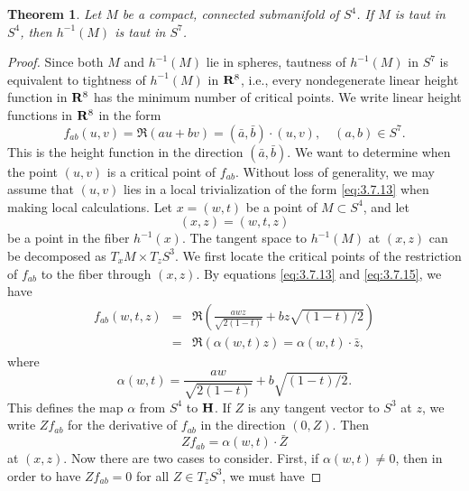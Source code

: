 \documentclass[12pt]{article}
\newtheorem{theorem}{Theorem}[section]
\begin{document}
\begin{theorem}
\label{thm:3.7.1} 
Let $M$ be a compact, connected submanifold of $S^4$.  If $M$ is taut in $S^4$, then $h^{-1}(M)$ is taut in $S^7$.
\end{theorem}
\begin{proof}
Since both $M$ and $h^{-1}(M)$ lie in spheres, tautness of $h^{-1}(M)$ in $S^7$ is equivalent to tightness of
$h^{-1}(M)$ in ${\bf R}^8$, i.e., every nondegenerate linear 
height function in ${\bf R}^8$ has the minimum number
of critical points.  We write linear height functions in ${\bf R}^8$ in the form
\begin{equation} 
\label{eq:3.7.15}
f_{ab} (u,v) = \Re (au + bv) = (\bar{a}, \bar{b}) \cdot (u,v), \quad (a,b) \in S^7.
\end{equation}
This is the height function in the direction $(\bar{a}, \bar{b})$.  We want to determine when the point $(u,v)$
is a critical point of $f_{ab}$.  Without loss of generality, we may assume that $(u,v)$ lies in a local
trivialization of the form \eqref{eq:3.7.13} when making local calculations.  Let $x = (w,t)$ be a point of
$M \subset S^4$, and let 
\begin{displaymath}
(x,z) = (w,t,z)
\end{displaymath}
be a point in the fiber $h^{-1}(x)$.  The tangent space to $h^{-1}(M)$
at $(x,z)$ can be decomposed as $T_x M \times T_z S^3$.  We first locate the critical points of the restriction of 
$f_{ab}$ to the fiber through $(x,z)$.  By equations \eqref{eq:3.7.13} and \eqref{eq:3.7.15}, we have
\begin{eqnarray} 
\label{eq:3.7.16}
f_{ab} (w,t,z) & = & \Re \left(\frac{awz}{\sqrt{2(1-t)}} + bz \sqrt{(1-t)/2} \right) \\
& = & \Re (\alpha (w,t) z) = \alpha (w,t) \cdot \bar{z}, \nonumber
\end{eqnarray}
where
\begin{displaymath}
\alpha (w,t) = \frac{aw}{\sqrt{2(1-t)}} + b \sqrt{(1-t)/2}.
\end{displaymath}
This defines the map $\alpha$ from $S^4$ to ${\bf H}$.  If $Z$ is any tangent vector to $S^3$ at $z$, we write
$Zf_{ab}$ for the derivative of $f_{ab}$ in the direction $(0,Z)$.  Then
\begin{equation} 
\label{eq:3.7.17}
Zf_{ab} = \alpha (w,t) \cdot \bar{Z}
\end{equation}
at $(x,z)$.  Now there are two cases to consider.  First, if $\alpha (w,t) \neq 0$, then in order to have 
$Zf_{ab} = 0$ for all $Z \in T_z S^3$, we must have

\end{proof}
\end{document}
